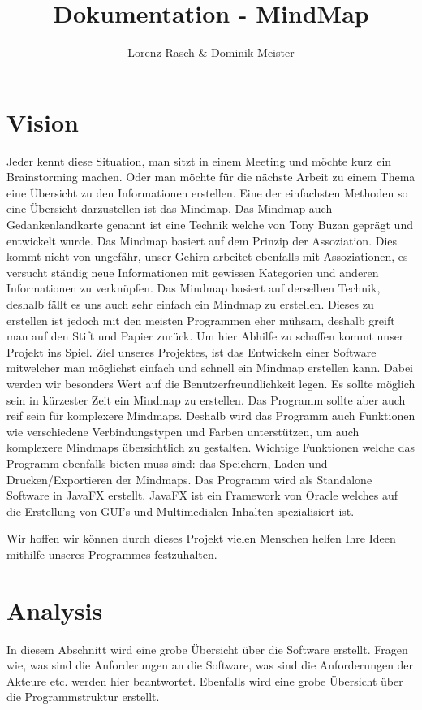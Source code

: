 \documentclass[a4paper,parskip]{scrartcl}
\title{Dokumentation - MindMap}
\author{Lorenz Rasch \& Dominik Meister}
\begin{document}
\maketitle
\tableofcontents
\pagebreak

\section{Vision}
Jeder kennt diese Situation, man sitzt in einem Meeting und möchte kurz ein Brainstorming machen. Oder man
möchte für die nächste Arbeit zu einem Thema eine Übersicht zu den Informationen erstellen. Eine der einfachsten Methoden so eine Übersicht darzustellen ist das Mindmap. 
Das Mindmap auch Gedankenlandkarte genannt ist eine Technik welche von Tony Buzan geprägt und entwickelt wurde. Das Mindmap basiert auf dem Prinzip der Assoziation. Dies kommt nicht von ungefähr, unser Gehirn arbeitet ebenfalls mit Assoziationen, es versucht ständig neue Informationen mit gewissen Kategorien und anderen Informationen zu verknüpfen. Das Mindmap basiert auf derselben Technik, deshalb fällt es uns auch sehr einfach ein Mindmap zu erstellen.
Dieses zu erstellen ist jedoch mit den meisten Programmen eher mühsam, deshalb greift man auf den Stift und Papier zurück. Um hier Abhilfe zu schaffen kommt unser Projekt ins Spiel.
Ziel unseres Projektes, ist das Entwickeln einer Software mitwelcher man möglichst einfach und schnell ein Mindmap erstellen kann. 
Dabei werden wir besonders Wert auf die Benutzerfreundlichkeit legen. Es sollte möglich sein in kürzester Zeit ein Mindmap zu erstellen. Das Programm sollte aber auch reif sein für komplexere Mindmaps.
Deshalb wird das Programm auch Funktionen wie verschiedene Verbindungstypen und Farben unterstützen, um auch komplexere Mindmaps übersichtlich zu gestalten.
Wichtige Funktionen welche das Programm ebenfalls bieten muss sind: das Speichern, Laden und Drucken/Exportieren der Mindmaps. 
Das Programm wird als Standalone Software in JavaFX erstellt. JavaFX ist ein Framework von Oracle welches auf die Erstellung von GUI's und Multimedialen Inhalten spezialisiert ist.

Wir hoffen wir können durch dieses Projekt vielen Menschen helfen Ihre Ideen mithilfe unseres Programmes
festzuhalten.

\section{Analysis}
In diesem Abschnitt wird eine grobe Übersicht über die Software erstellt. Fragen wie, was sind die Anforderungen an die Software, was sind die Anforderungen der Akteure etc. werden hier beantwortet. Ebenfalls wird eine grobe Übersicht über die Programmstruktur erstellt.
\end{document}
